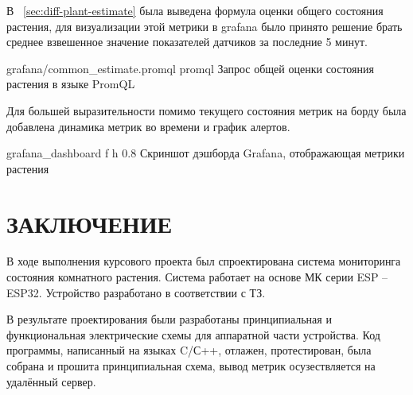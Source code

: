\documentclass{bmstu}
\begin{document}
    В ~\ref{sec:diff-plant-estimate} была выведена формула оценки общего состояния растения,
    для визуализации этой метрики в grafana было принято решение брать среднее взвешенное значение показателей
    датчиков за последние 5 минут.

        {grafana/common_estimate.promql} %
        {promql}
        {Запрос общей оценки состояния растения в языке PromQL} %

    Для большей выразительности помимо текущего состояния метрик на борду была добавлена динамика метрик во времени и
    график алертов.

        {grafana_dashboard}
        {f}
        {h}
        {0.8\textwidth}
        {Скриншот дэшборда Grafana, отображающая метрики растения}




    \chapter*{ЗАКЛЮЧЕНИЕ}

    В ходе выполнения курсового проекта был спроектирована система мониторинга состояния комнатного растения.
    Система работает на основе МК серии ESP – ESP32.
    Устройство разработано в соответствии с ТЗ.

    В результате проектирования были разработаны принципиальная и функциональная электрические схемы для аппаратной части устройства. Код программы, написанный на языках C/С++, отлажен, протестирован, была собрана и прошита принципиальная схема, вывод метрик осузествляется на удалённый сервер.

    \makebibliography
\end{document}
